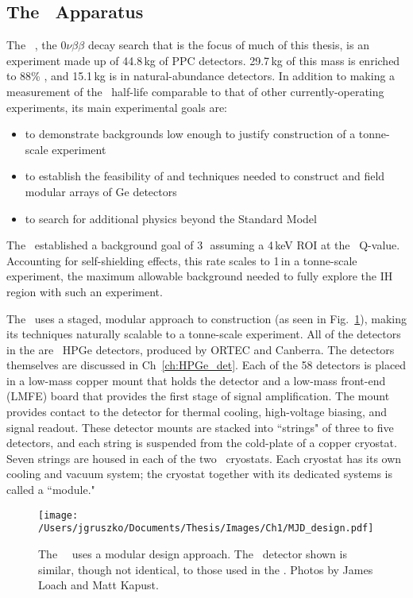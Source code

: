 \subsection{The \DEM\ Apparatus}
The \MJ~\MJDemo, the $0\nu\beta\beta$ decay search that is the focus of much of this thesis, is an experiment made up of 44.8\,kg of PPC detectors. 29.7\,kg of this mass is enriched to 88\% , and 15.1\,kg is in natural-abundance detectors. In addition to making a measurement of the \nonubb\ half-life comparable to that of other currently-operating experiments, its main experimental goals are:
\begin{itemize}
\item to demonstrate backgrounds low enough to justify construction of a tonne-scale experiment
\item to establish the feasibility of and techniques needed to construct and field modular arrays of Ge detectors
\item to search for additional physics beyond the Standard Model
\end{itemize}
The \DEM\ established a background goal of 3\,\cpRty\, assuming a 4\,keV ROI at the \nonubb\ Q-value. Accounting for self-shielding effects, this rate scales to 1\,\cpRty in a tonne-scale experiment, the maximum allowable background needed to fully explore the IH region with such an experiment. 

The \MJDemo~uses a staged, modular approach to construction (as seen in Fig.~\ref{fig:MJ_modular}), making its techniques naturally scalable to a tonne-scale experiment. All of the detectors in the \DEM are \ppc\ HPGe detectors, produced by ORTEC and Canberra. The detectors themselves are discussed in Ch~\ref{ch:HPGe_det}. Each of the 58 detectors is placed in a low-mass copper mount that holds the detector and a low-mass front-end (LMFE) board that provides the first stage of signal amplification. The mount provides contact to the detector for thermal cooling, high-voltage biasing, and signal readout. These detector mounts are stacked into ``strings" of three to five detectors, and each string is suspended from the cold-plate of a copper cryostat. Seven strings are housed in each of the two \MJ\ cryostats. Each cryostat has its own cooling and vacuum system; the cryostat together with its dedicated systems is called a ``module." 

\begin{figure}[t]
\centering
\texttt{[image: /Users/jgruszko/Documents/Thesis/Images/Ch1/MJD\_design.pdf]}
\caption{The \MJ\ \DEM\ uses a modular design approach. The \ppc\ detector shown is similar, though not identical, to those used in the \DEM. Photos by James Loach and Matt Kapust.}
\label{fig:MJ_modular}
\end{figure}

